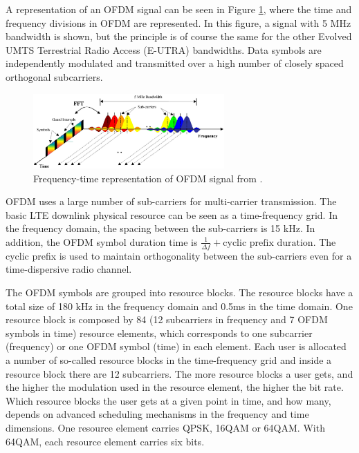 A representation of an OFDM signal can be seen in Figure \ref{fig:ofdmfreq},
where the time and frequency divisions in OFDM are represented. In this figure,
a signal with 5 MHz bandwidth is shown, but the principle is of course the same
for the other Evolved UMTS Terrestrial Radio Access (E-UTRA) bandwidths. Data
symbols are independently modulated and transmitted over a high number of
closely spaced orthogonal subcarriers.

\begin{figure}[htbp]
    \centering
    \includegraphics[width=0.65\textwidth]{./figures/ofdm_frequency}
    \caption{ Frequency-time representation of OFDM signal from \cite{umtslte}.
    \label{fig:ofdmfreq}}
\end{figure}

OFDM uses a large number of sub-carriers for multi-carrier transmission. The
basic LTE downlink physical resource can be seen as a time-frequency grid. In
the frequency domain, the spacing between the sub-carriers is 15 kHz. In
addition, the OFDM symbol duration time is $\frac{1}{\Delta f} + \text{cyclic
prefix duration}$. The cyclic prefix is used to maintain orthogonality between
the sub-carriers even for a time-dispersive radio channel.

The OFDM symbols are grouped into resource blocks. The resource blocks have a
total size of 180 kHz in the frequency domain and 0.5ms in the time domain. One
resource block is composed by 84 (12 subcarriers in frequency and 7 OFDM symbols
in time) resource elements, which corresponds to one subcarrier (frequency) or
one OFDM symbol (time) in each element. Each user is allocated a number of
so-called resource blocks in the time-frequency grid and inside a resource block
there are 12 subcarriers. The more resource blocks a user gets, and the higher
the modulation used in the resource element, the higher the bit rate. Which
resource blocks the user gets at a given point in time, and how many, depends on
advanced scheduling mechanisms in the frequency and time dimensions. One
resource element carries QPSK, 16QAM or 64QAM. With 64QAM, each resource element
carries six bits.


